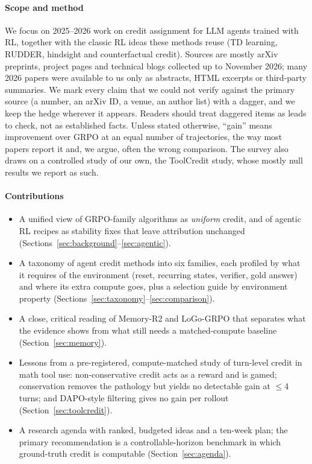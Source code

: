 \paragraph{Scope and method}
We focus on 2025--2026 work on credit assignment for LLM agents trained with RL, together with the classic RL ideas these methods reuse (TD learning, RUDDER, hindsight and counterfactual credit). Sources are mostly arXiv preprints, project pages and technical blogs collected up to November 2026; many 2026 papers were available to us only as abstracts, HTML excerpts or third-party summaries. We mark every claim that we could not verify against the primary source (a number, an arXiv ID, a venue, an author list) with a dagger,\unverified{} and we keep the hedge wherever it appears. Readers should treat daggered items as leads to check, not as established facts. Unless stated otherwise, ``gain'' means improvement over GRPO at an equal number of trajectories, the way most papers report it and, we argue, often the wrong comparison. The survey also draws on a controlled study of our own, the ToolCredit study, whose mostly null results we report as such.

\paragraph{Contributions}
\begin{itemize}
  \item A unified view of GRPO-family algorithms as \emph{uniform} credit, and of agentic RL recipes as stability fixes that leave attribution unchanged (Sections~\ref{sec:background}--\ref{sec:agentic}).
  \item A taxonomy of agent credit methods into six families, each profiled by what it requires of the environment (reset, recurring states, verifier, gold answer) and where its extra compute goes, plus a selection guide by environment property (Sections~\ref{sec:taxonomy}--\ref{sec:comparison}).
  \item A close, critical reading of Memory-R2 and LoGo-GRPO that separates what the evidence shows from what still needs a matched-compute baseline (Section~\ref{sec:memory}).
  \item Lessons from a pre-registered, compute-matched study of turn-level credit in math tool use: non-conservative credit acts as a reward and is gamed; conservation removes the pathology but yields no detectable gain at $\leq$4 turns; and DAPO-style filtering gives no gain per rollout (Section~\ref{sec:toolcredit}).
  \item A research agenda with ranked, budgeted ideas and a ten-week plan; the primary recommendation is a controllable-horizon benchmark in which ground-truth credit is computable (Section~\ref{sec:agenda}).
\end{itemize}

